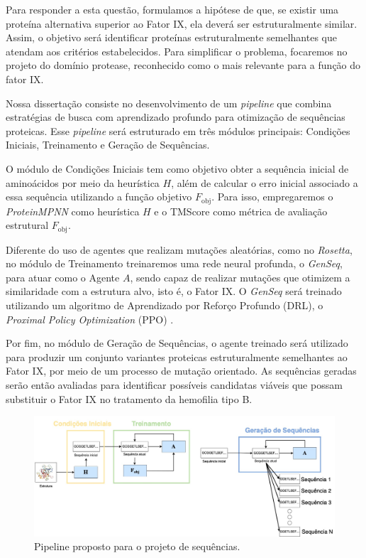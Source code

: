 Para responder a esta questão, formulamos a hipótese de que, 
se existir uma proteína alternativa superior ao Fator IX, 
ela deverá ser estruturalmente similar. 
Assim, o objetivo será identificar proteínas estruturalmente semelhantes que atendam aos critérios estabelecidos.
Para simplificar o problema, focaremos no projeto do domínio protease, 
reconhecido como o mais relevante para a função do fator IX.

Nossa dissertação consiste no desenvolvimento de um \textit{pipeline} que combina estratégias de busca 
com aprendizado profundo para otimização de sequências proteicas. 
Esse \textit{pipeline} será estruturado em três módulos principais: Condições Iniciais, 
Treinamento e Geração de Sequências.


O módulo de Condições Iniciais tem como objetivo obter a sequência inicial de aminoácidos 
por meio da heurística \( H \), além de calcular o erro inicial associado a essa sequência 
utilizando a função objetivo \( F_{\text{obj}} \). 
Para isso, empregaremos o \textit{ProteinMPNN} como heurística \( H \) 
e o TMScore como métrica de avaliação estrutural \( F_{\text{obj}} \).  

Diferente do uso de agentes que realizam mutações aleatórias, como no \textit{Rosetta},
no módulo de Treinamento treinaremos uma rede neural profunda, o \textit{GenSeq}, para atuar como o Agente $A$,
sendo capaz de realizar mutações que otimizem a similaridade com a estrutura alvo, isto é, o Fator IX.
O \textit{GenSeq} será treinado utilizando um algoritmo de Aprendizado por Reforço Profundo (DRL), 
o \textit{Proximal Policy Optimization} (PPO) \cite{PPO}.

Por fim, no módulo de Geração de Sequências, 
o agente treinado será utilizado para produzir um conjunto variantes proteicas estruturalmente semelhantes ao Fator IX,
por meio de um processo de mutação orientado. 
As sequências geradas serão então avaliadas para identificar possíveis candidatas viáveis 
que possam substituir o Fator IX no tratamento da hemofilia tipo B.

\begin{figure}[H]
  \centering
  \includegraphics[width=.8\textwidth]{figuras/metodologia-pipeline_proposta.jpg}
  \caption{Pipeline proposto para o projeto de sequências.}
  \label{fig:proposta}
\end{figure}

